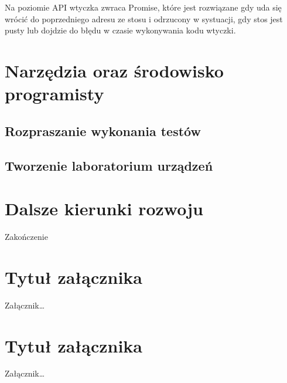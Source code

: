 \documentclass[brudnopis]{xmgr}
\begin{document}
Na poziomie API wtyczka zwraca Promise, które jest rozwiązane gdy uda się wrócić do poprzedniego adresu ze stosu i odrzucony w systuacji, gdy stos jest pusty lub dojdzie do błędu w czasie wykonywania kodu wtyczki.

\chapter{Narzędzia oraz środowisko programisty}

\section{Rozpraszanie wykonania testów}

\section{Tworzenie laboratorium urządzeń}

\chapter{Dalsze kierunki rozwoju}

\summary

Zakończenie

\appendix
\chapter{Tytuł załącznika}

Załącznik…

\chapter{Tytuł załącznika}

Załącznik…






\oswiadczenie
\end{document}
